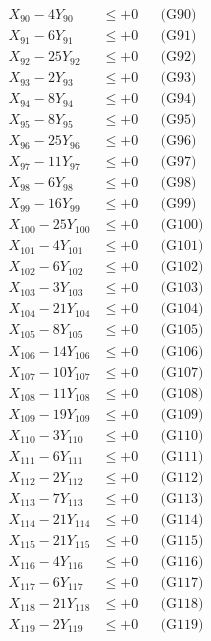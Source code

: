 \documentclass[a4paper,10pt]{article}
\begin{document}
{\begin{align}
X_{90} - 4Y_{90} &\leq +0 && \text{(G90)} \\
X_{91} - 6Y_{91} &\leq +0 && \text{(G91)} \\
X_{92} - 25Y_{92} &\leq +0 && \text{(G92)} \\
X_{93} - 2Y_{93} &\leq +0 && \text{(G93)} \\
\allowbreak
X_{94} - 8Y_{94} &\leq +0 && \text{(G94)} \\
X_{95} - 8Y_{95} &\leq +0 && \text{(G95)} \\
X_{96} - 25Y_{96} &\leq +0 && \text{(G96)} \\
X_{97} - 11Y_{97} &\leq +0 && \text{(G97)} \\
X_{98} - 6Y_{98} &\leq +0 && \text{(G98)} \\
X_{99} - 16Y_{99} &\leq +0 && \text{(G99)} \\
X_{100} - 25Y_{100} &\leq +0 && \text{(G100)} \\
X_{101} - 4Y_{101} &\leq +0 && \text{(G101)} \\
X_{102} - 6Y_{102} &\leq +0 && \text{(G102)} \\
X_{103} - 3Y_{103} &\leq +0 && \text{(G103)} \\
\allowbreak
X_{104} - 21Y_{104} &\leq +0 && \text{(G104)} \\
X_{105} - 8Y_{105} &\leq +0 && \text{(G105)} \\
X_{106} - 14Y_{106} &\leq +0 && \text{(G106)} \\
X_{107} - 10Y_{107} &\leq +0 && \text{(G107)} \\
X_{108} - 11Y_{108} &\leq +0 && \text{(G108)} \\
X_{109} - 19Y_{109} &\leq +0 && \text{(G109)} \\
X_{110} - 3Y_{110} &\leq +0 && \text{(G110)} \\
X_{111} - 6Y_{111} &\leq +0 && \text{(G111)} \\
X_{112} - 2Y_{112} &\leq +0 && \text{(G112)} \\
X_{113} - 7Y_{113} &\leq +0 && \text{(G113)} \\
\allowbreak
X_{114} - 21Y_{114} &\leq +0 && \text{(G114)} \\
X_{115} - 21Y_{115} &\leq +0 && \text{(G115)} \\
X_{116} - 4Y_{116} &\leq +0 && \text{(G116)} \\
X_{117} - 6Y_{117} &\leq +0 && \text{(G117)} \\
X_{118} - 21Y_{118} &\leq +0 && \text{(G118)} \\
X_{119} - 2Y_{119} &\leq +0 && \text{(G119)} \\

\end{align}}
\end{document}
